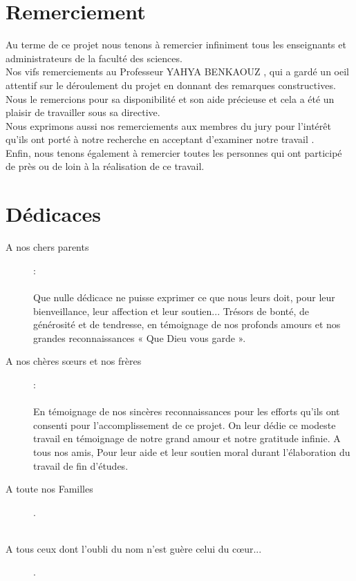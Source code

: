 \chapter*{Remerciement}

\begin{large}
Au terme de ce projet nous tenons à remercier infiniment tous les enseignants et
administrateurs de la faculté des sciences. \\


Nos vifs remerciements au Professeur YAHYA BENKAOUZ , qui a gardé un oeil attentif sur le déroulement du projet en donnant des remarques constructives. Nous le remercions pour sa disponibilité et son aide précieuse et cela a été un plaisir de travailler sous sa directive. \\

Nous exprimons aussi nos remerciements aux membres du jury pour l’intérêt qu’ils ont porté à notre recherche en acceptant d’examiner notre travail .\\
Enfin, nous tenons également à remercier toutes les personnes qui ont participé de près ou de loin à la réalisation de ce travail.
\end{large}

\newpage
\chapter*{Dédicaces}

\begin{description}
  \item[A nos chers parents] : \\ \\ Que nulle dédicace ne puisse exprimer ce que nous leurs doit, pour leur bienveillance, leur
affection et leur soutien... Trésors de bonté, de générosité et de tendresse, en témoignage de
nos profonds amours et nos grandes reconnaissances « Que Dieu vous garde ». 
\vspace{1cm}
  \item[A nos chères sœurs et nos frères] : \\  \\ En témoignage de nos sincères reconnaissances pour les efforts qu’ils ont consenti pour
l’accomplissement de ce projet. On leur dédie ce modeste travail en témoignage de notre
grand amour et notre gratitude infinie.
A tous nos amis, Pour leur aide et leur soutien moral durant l’élaboration du travail de fin d’études. 
\vspace{1cm}
  \item[A toute nos Familles]  . \\ \\
  \vspace{1cm}
   \item[ A tous ceux dont l’oubli du nom n’est guère celui du cœur...]  . \\ \\
\end{description}





 



